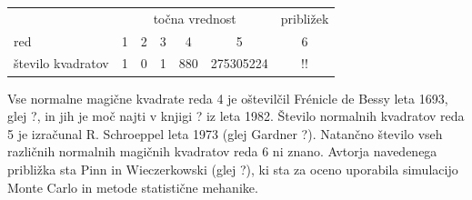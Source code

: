 \documentclass[a4paper,12pt]{article}
\begin{document}
\begin{table}[!ht]
      \begin{tabular}{lcccccc}\toprule\\\hline
      \label{table:stevila}
         & \multicolumn{5}{c}{točna vrednost} & približek \\
         red & 1 & 2 & 3 & 4 & 5 & 6 \\
         \midrule
         število kvadratov & 1 & 0 & 1 & 880 & 275305224 &!! \\
         \bottomrule
      \end{tabular}
\end{table}

Vse normalne magične kvadrate reda 4 je oštevilčil Frénicle de Bessy
leta 1693, glej \pageref?, in jih je moč najti v knjigi \pageref?
iz leta 1982. Število normalnih kvadratov reda 5 je izračunal
R. Schroeppel leta 1973 (glej Gardner \pageref?).
Natančno število vseh različnih normalnih magičnih kvadratov reda 6 ni znano.
Avtorja navedenega približka sta Pinn in Wieczerkowski (glej \pageref?), ki
sta za oceno uporabila simulacijo Monte Carlo in metode statistične mehanike.


\newpage


\end{document}
